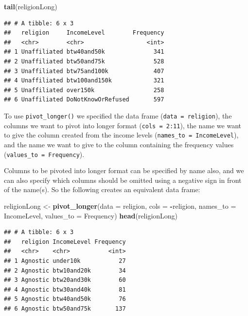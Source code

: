 \documentclass[
]{krantz}
\newenvironment{Shaded}{\begin{snugshade}}{\end{snugshade}}
\newcommand{\DataTypeTok}[1]{\textcolor[rgb]{0.13,0.29,0.53}{#1}}
\newcommand{\KeywordTok}[1]{\textcolor[rgb]{0.13,0.29,0.53}{\textbf{#1}}}
\newcommand{\NormalTok}[1]{#1}
\newcommand{\OperatorTok}[1]{\textcolor[rgb]{0.81,0.36,0.00}{\textbf{#1}}}
\newcommand{\StringTok}[1]{\textcolor[rgb]{0.31,0.60,0.02}{#1}}
\begin{document}
\begin{Shaded}
\begin{Highlighting}[]
\KeywordTok{tail}\NormalTok{(religionLong)}
\end{Highlighting}
\end{Shaded}

\begin{verbatim}
## # A tibble: 6 x 3
##   religion     IncomeLevel        Frequency
##   <chr>        <chr>                  <int>
## 1 Unaffiliated btw40and50k              341
## 2 Unaffiliated btw50and75k              528
## 3 Unaffiliated btw75and100k             407
## 4 Unaffiliated btw100and150k            321
## 5 Unaffiliated over150k                 258
## 6 Unaffiliated DoNotKnowOrRefused       597
\end{verbatim}

To use \texttt{pivot\_longer()} we specified the data frame (\texttt{data\ =\ religion}), the columns we want to pivot into longer format (\texttt{cols\ =\ 2:11}), the name we want to give the column created from the income levels (\texttt{names\_to\ =\ \textquotesingle{}IncomeLevel\textquotesingle{}}), and the name we want to give to the column containing the frequency values (\texttt{values\_to\ =\ \textquotesingle{}Frequency\textquotesingle{}}).

Columns to be pivoted into longer format can be specified by name also, and we can also specify which columns should be omitted using a negative sign in front of the name(s). So the following creates an equivalent data frame:

\begin{Shaded}
\begin{Highlighting}[]
\NormalTok{religionLong \textless{}{-}}\StringTok{ }\KeywordTok{pivot\_longer}\NormalTok{(}\DataTypeTok{data =}\NormalTok{ religion, }\DataTypeTok{cols =} \OperatorTok{{-}}\NormalTok{religion, }
                     \DataTypeTok{names\_to =} \StringTok{\textquotesingle{}IncomeLevel\textquotesingle{}}\NormalTok{, }\DataTypeTok{values\_to =} \StringTok{\textquotesingle{}Frequency\textquotesingle{}}\NormalTok{) }
\KeywordTok{head}\NormalTok{(religionLong)}
\end{Highlighting}
\end{Shaded}

\begin{verbatim}
## # A tibble: 6 x 3
##   religion IncomeLevel Frequency
##   <chr>    <chr>           <int>
## 1 Agnostic under10k           27
## 2 Agnostic btw10and20k        34
## 3 Agnostic btw20and30k        60
## 4 Agnostic btw30and40k        81
## 5 Agnostic btw40and50k        76
## 6 Agnostic btw50and75k       137
\end{verbatim}
\end{document}
